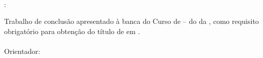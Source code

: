 %
%

\makeatletter
\begin{folhaderosto}
	\thispagestyle{empty}%
	
    \begin{center}
    
		\small\textbf{\expandafter\uppercase\expandafter{\imprimirnomeautor}}\\
		\vspace*{8.2 cm}%
		\normalsize\textbf{\expandafter\uppercase\expandafter{\imprimirtitulotb}}{:}
		\normalsize\textbf{\expandafter\uppercase\expandafter{\imprimirsubtitulo}}\\
    \end{center}
	
	\vspace*{0.35 cm}%
		    \large%
    		\hfill%
	    	\begin{minipage}{8 cm}%
	    		\begin{small} %
	    		\setlength{\baselineskip}{0.7\baselineskip}
				
				{Trabalho de conclusão apresentado à banca do Curso de {\imprimircurso} – {\imprimirprograma } do {\imprimirdepartamento} da {\imprimirinstituicao}, como requisito obrigatório para obtenção do título de {\imprimirgrau} em {\imprimircurso}.}\\{
		    	}\\Orientador: {\imprimirtitulacaoorientador }{ }{\imprimirorientador}\\{
		    	}
				
				
				\end{small} %
		    \end{minipage}%
		    	
		    \vspace*{10 cm}%
		    
		    \begin{center} %
		    	\normalsize %
	    		\imprimirlocal\\
	    		\imprimirdata
	    	\end{center}%

\end{folhaderosto}
\makeatother
